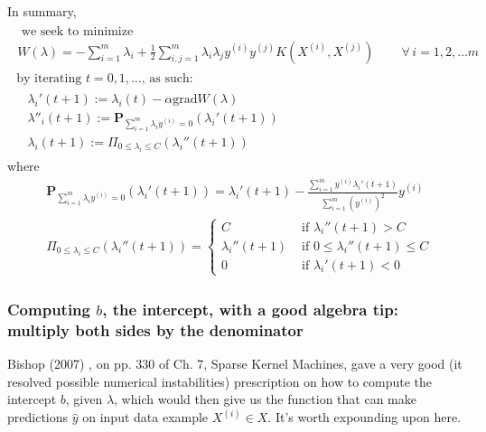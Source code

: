 \documentclass[10pt]{amsart}
\begin{document}
\begin{multicols*}{2}
In summary,
\begin{equation}
\begin{gathered}
  \begin{gathered}
    \text{ we seek to minimize } \\
    W(\lambda) = - \sum_{i=1}^m \lambda_i + \frac{1}{2} \sum_{i,j=1}^m \lambda_i \lambda_j y^{(i)} y^{(j)} K(X^{(i)},X^{(j)}) \qquad \, \forall \, i=1,2,\dots m 
  \end{gathered} \\
  \text{  by iterating $t=0,1,\dots $, as such: } \\
  \begin{aligned}
    & \lambda_i'(t+1):=\lambda_i(t) - \alpha \text{grad}{ W(\lambda) } \\ 
    & \lambda''_i(t+1):= \mathbf{P}_{\sum_{i=1}^m \lambda_i y^{(i)} = 0 }( \lambda_i'(t+1)) \\ 
    & \lambda_i(t+1) := \Pi_{0\leq \lambda_i \leq C}(\lambda_i''(t+1))
    \end{aligned}
\end{gathered}
\end{equation}
where
\begin{equation}
\begin{aligned}
& \mathbf{P}_{\sum_{i=1}^m \lambda_i y^{(i)} = 0 }( \lambda_i'(t+1)) = \lambda_i'(t+1) - \frac{ \sum_{i=1}^m y^{(i)}\lambda_i'(t+1) }{ \sum_{i=1}^m (y^{(i)})^2 } y^{(i)} \\ 
  & \Pi_{0\leq \lambda_i \leq C}(\lambda_i''(t+1)) = \begin{cases} C & \text{ if } \lambda_i''(t+1) > C \\
    \lambda_i''(t+1) & \text{ if } 0 \leq \lambda_i''(t+1) \leq C \\
    0 & \text{ if } \lambda_i'(t+1) <0 \end{cases}
\end{aligned}
\end{equation}

\subsubsection{Computing $b$, the intercept, with a good algebra tip: multiply both sides by the denominator}

Bishop (2007) \cite{Bish2007}, on pp. 330 of Ch. 7, Sparse Kernel Machines,  gave a very good (it resolved possible numerical instabilities) prescription on how to compute the intercept $b$, given $\lambda$, which would then give us the function that can make predictions $\widehat{y}$ on input data example $X^{(i)} \in X$.  It's worth expounding upon here.  


\end{multicols*}
\end{document}
